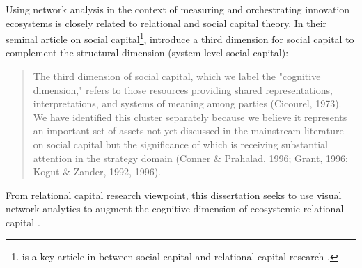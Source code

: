 Using network analysis in the context of measuring and orchestrating innovation ecosystems is closely related to relational and social capital theory. In their seminal article on social capital\footnote{\cite{Nahapiet1998} is a key article in between social capital and relational capital research \citep[cf.][]{Still2013relationalsocialcapital}.}, \cite{Nahapiet1998} introduce a third dimension for social capital to complement the structural dimension (system-level social capital):

\begin{quote}
The third dimension of social capital, which we label the "cognitive dimension," refers to those resources providing shared representations, interpretations, and systems of meaning among parties (Cicourel, 1973). We have identified this cluster separately because we believe it represents an important set of assets not yet discussed in the mainstream literature on social capital but the significance of which is receiving substantial attention in the strategy domain (Conner \& Prahalad, 1996; Grant, 1996; Kogut \& Zander, 1992, 1996). 
\end{quote}

From relational capital research viewpoint, this dissertation seeks to use visual network analytics to augment the cognitive dimension of ecosystemic relational capital \citep{Still2014EcosystemicRelationalCapital}.

